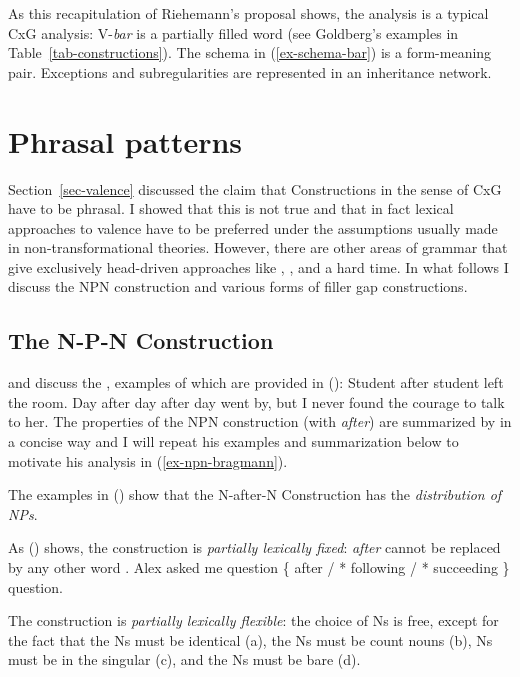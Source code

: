 \documentclass[output=paper]{langsci/langscibook}
\begin{document}
As this recapitulation of Riehemann's proposal shows, the analysis is a typical CxG analysis:
V-\emph{bar} is a partially filled word (see Goldberg's examples in
Table~\ref{tab-constructions}). The schema in (\ref{ex-schema-bar}) is a form-meaning
pair. Exceptions and subregularities are represented in an inheritance network.


\section{Phrasal patterns}
\label{sec-phrasal-patterns}
\label{sec-phrasal}

Section~\ref{sec-valence} discussed the claim that Constructions in the sense of CxG have to be phrasal. I
showed that this is not true and that in fact lexical approaches to valence have to be preferred
under the assumptions usually made in non-transformational theories. However, there are other areas
of grammar that give exclusively head-driven approaches like \cg, \minimalism, and \dg a hard
time. In what follows I discuss the NPN construction and various forms of filler gap constructions.

\subsection{The N-P-N Construction}
\label{sec-npn}

\citet{Matsuyama2004a} and \citet{Jackendoff2008a} discuss the , examples
of
which are provided in ():
\eal
\ex Student after student left the room.
\ex
\label{ex-npn-iteration}
Day after day after day went by, but I never found the courage to talk to
her. \citep{Bargmann2015a}
\zl
The properties of the NPN construction (with \emph{after})  are summarized by \citet{Bargmann2015a}
in a concise way and I will repeat his examples and summarization below to motivate his analysis in (\ref{ex-npn-bragmann}).

The examples in () show that the N-after-N Construction has the \emph{distribution of NPs}.

As () shows, the construction is \emph{partially lexically fixed}: \emph{after} cannot be
replaced by any other word \citep[]{Matsuyama2004a}.
\ea
Alex asked me question \{ after / * following / * succeeding \} question.
\z

The construction is \emph{partially lexically flexible}: the choice of Ns is free, except for the fact that
the Ns must be identical (a), the Ns must be count nouns (b), Ns must be in the
singular (c), and the Ns must be bare (d).
\end{document}
